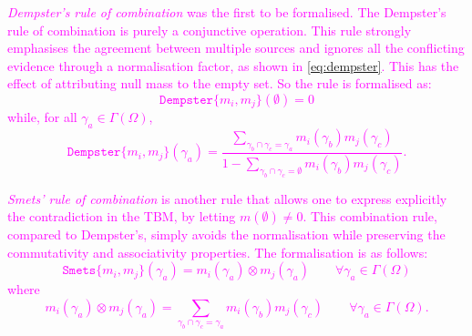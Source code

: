 \documentclass[journal]{IEEEtran}
\newcommand{\GO}[1]{\textcolor{magenta}{{#1}}}
\begin{document}
\GO{\textit{Dempster's rule of combination} \cite{dempster_upperlower_2008} was the first to be formalised. The Dempster's rule of combination is purely a conjunctive operation. This rule strongly emphasises the agreement between multiple sources and ignores all the conflicting evidence through a normalisation factor, as shown in \eqref{eq:dempster}. This has the effect of attributing null mass to the empty set. So the rule is formalised as:
\begin{equation}
\nonumber \texttt{Dempster} \{ m_i, m_j\} (\emptyset)  = 0 
\end{equation}
while, for all $\gamma_a\in \Gamma(\Omega)$,
\begin{equation}
\texttt{Dempster} \{ m_i, m_j\} (\gamma_a)  = \frac{\displaystyle\sum_{\gamma_b \cap \gamma_c = \gamma_a} m_i(\gamma_b) m_j(\gamma_c)}{1-\displaystyle\sum_{\gamma_b \cap \gamma_c = \emptyset} m_i(\gamma_b) m_j(\gamma_c)}.
\label{eq:dempster}
\end{equation}}

\GO{\textit{Smets' rule of combination} \cite{smets_transferable_1990} is another rule that allows one to express explicitly the contradiction in the TBM, by letting $m(\emptyset)\neq 0$. This combination rule, compared to Dempster's, simply avoids the normalisation while preserving the commutativity and associativity properties. The formalisation is as follows:
\begin{equation}
\texttt{Smets} \{ m_i, m_j\} (\gamma_a)  = m_i(\gamma_a) \otimes m_j(\gamma_a) \qquad\forall\gamma_a\in \Gamma(\Omega)
\end{equation}
where}
\GO{\begin{equation}
m_i(\gamma_a) \otimes m_j(\gamma_a)= \sum_{\gamma_b \cap \gamma_c =\gamma_a} m_i(\gamma_b) m_j(\gamma_c) \qquad\forall\gamma_a\in \Gamma(\Omega).
\label{eq:smets}
\end{equation}}
\end{document}
